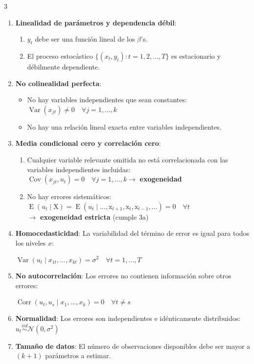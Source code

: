 \documentclass[10pt, a4paper, landscape]{article}
\DeclareMathOperator{\E}{E}
\DeclareMathOperator{\Var}{Var}
\DeclareMathOperator{\Cov}{Cov}
\DeclareMathOperator{\Corr}{Corr}
\begin{document}
\begin{multicols}{3}
\begin{enumerate}[leftmargin=*, label=t\arabic{*}.]
	\item \textbf{Linealidad de parámetros y dependencia débil}:
	\begin{enumerate}[leftmargin=*, label=\alph{*}.]
		\item \( y_{t} \) debe ser una función lineal de los \( \beta \)'s.
		\item El proceso estocástico \( \lbrace (x_{t}, y_{t}) : t = 1, 2, \ldots, T \rbrace \) es estacionario y débilmente dependiente.
	\end{enumerate}
	\item \textbf{No colinealidad perfecta}:
	\begin{itemize}[leftmargin=*]
		\item No hay variables independientes que sean constantes: \( \Var(x_{jt}) \neq 0 \quad \forall j = 1, \ldots, k \)
		\item No hay una relación lineal exacta entre variables independientes.
	\end{itemize}
	\item \textbf{Media condicional cero y correlación cero}:
	\begin{enumerate}[leftmargin=*, label=\alph{*}.]
		\item Cualquier variable relevante omitida no está correlacionada con las variables independientes incluidas: \\
		\( \Cov(x_{jt} , u_{t}) = 0 \quad \forall j = 1, \ldots, k \rightarrow \) \textbf{exogeneidad}
		\item No hay errores sistemáticos: \\
		\( \E(u_{t} \mid \mathrm{X}) = \E(u_{t} \mid \ldots, \mathrm{x}_{t+1}, \mathrm{x}_{t}, \mathrm{x}_{t-1}, \ldots) = 0 \quad \forall t \) \\
		\( \rightarrow \) \textbf{exogeneidad estricta} (cumple 3a)
	\end{enumerate}
	\item \textbf{Homocedasticidad}: La variabilidad del término de error es igual para todos los niveles \( x \):
	\begin{center}
		\( \Var(u_{t} \mid x_{1t}, \ldots, x_{kt}) = \sigma^{2} \quad \forall t = 1, \ldots, T \)
	\end{center}
	\item \textbf{No autocorrelación}: Los errores no contienen información sobre otros errores:
	\begin{center}
		\( \Corr(u_{t}, u_{s} \mid x_{1}, \ldots, x_{k}) = 0 \quad \forall t \neq s \)
	\end{center}
	\item \textbf{Normalidad}: Los errores son independientes e idénticamente distribuidos: \( u_{t} \overset{iid}{\sim} \mathcal{N} (0, \sigma^{2}) \)
	\item \textbf{Tamaño de datos}: El número de observaciones disponibles debe ser mayor a \( (k + 1) \) parámetros a estimar.
\end{enumerate}


\end{multicols}
\end{document}
